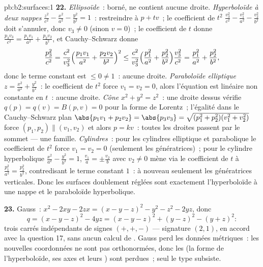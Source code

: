 \begin{solution}{pb:b2:surfaces:1}
\textbf{22.} \emph{Ellipsoïde}~: borné, ne contient aucune droite.
\emph{Hyperboloïde à deux nappes} $\frac{z^2}{c^2} -
\frac{x^2}{a^2} - \frac{y^2}{b^2} = 1$~: restreindre à $p + tv$~;
le coefficient de $t^2$ $\frac{v_3^2}{c^2} - \frac{v_1^2}{a^2}
- \frac{v_2^2}{b^2}$ doit s'annuler, donc $v_3 \neq 0$ (sinon $v =
0$)~; le coefficient de $t$ donne $\frac{p_3v_3}{c^2} =
\frac{p_1v_1}{a^2} + \frac{p_2v_2}{b^2}$, et Cauchy--Schwarz
donne
\[
\frac{p_3^2}{c^2}
= \frac{c^2}{v_3^2}\Bigl(\frac{p_1v_1}{a^2} +
\frac{p_2v_2}{b^2}\Bigr)^2
\leq \frac{c^2}{v_3^2}\Bigl(\frac{p_1^2}{a^2} +
\frac{p_2^2}{b^2}\Bigr)\frac{v_3^2}{c^2}
= \frac{p_1^2}{a^2} + \frac{p_2^2}{b^2},
\]
donc le terme constant est $\leq 0 \neq 1$~: aucune droite.
\emph{Paraboloïde elliptique} $z = \frac{x^2}{a^2} +
\frac{y^2}{b^2}$~: le coefficient de $t^2$ force $v_1 = v_2 =
0$, alors l'équation est linéaire non constante en $t$~: aucune droite.
\emph{Cône} $x^2 + y^2 = z^2$~: une droite dessus vérifie $q(p) =
q(v) = B(p, v) = 0$ pour la forme de Lorentz~; l'égalité dans le
Cauchy--Schwarz plan $\abs{p_1v_1 + p_2v_2} = \abs{p_3v_3} =
\sqrt{(p_1^2 + p_2^2)(v_1^2 + v_2^2)}$ force $(p_1, p_2)
\parallel (v_1, v_2)$ et alors $p = kv$~: toutes les droites passent
par le sommet --- une famille. \emph{Cylindres}~: pour les
cylindres elliptique et parabolique le coefficient de $t^2$ force
$v_1 = v_2 = 0$ (seulement les génératrices)~; pour le cylindre hyperbolique
$\frac{x^2}{a^2} - \frac{y^2}{b^2} = 1$, $\frac{v_1}a = \pm
\frac{v_2}b$ avec $v_2 \neq 0$ mène via le coefficient de $t$
à $\frac{p_1^2}{a^2} = \frac{p_2^2}{b^2}$, contredisant le
terme constant $1$~: à nouveau seulement les génératrices verticales. Donc les
surfaces  doublement réglées sont exactement l'hyperboloïde à une
nappe et le paraboloïde hyperbolique.

\textbf{23.} Gauss~: $x^2 - 2xy - 2zx = (x - y - z)^2 - y^2 -
z^2 - 2yz$, donc
\[
q = (x - y - z)^2 - 4yz = (x - y - z)^2 + (y - z)^2 - (y +
z)^2 :
\]
trois carrés indépendants de signes $(+, +, -)$ --- signature
$(2, 1)$, en accord avec la question 17, sans aucun calcul de . Gauss perd les données métriques~: les nouvelles coordonnées
ne sont pas orthonormées, donc les  (la forme de
l'hyperboloïde, ses axes et leurs ) sont perdues~; seul le
type  subsiste.


\end{solution}
